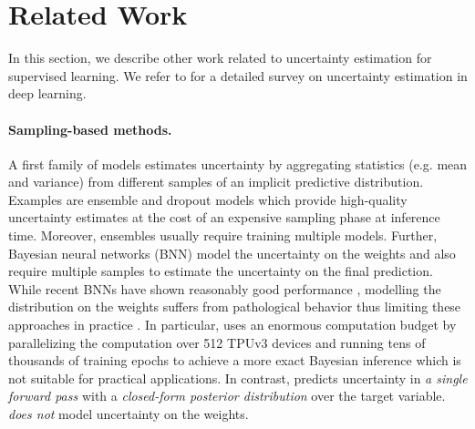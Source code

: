 \section{Related Work}
\label{sec:related_work_007}

In this section, we describe other work related to uncertainty estimation for supervised learning. We refer to \cite{uncertainty-survey} for a detailed survey on uncertainty estimation in deep learning. 

\paragraph{Sampling-based methods.} A first family of models estimates uncertainty by aggregating statistics (e.g. mean and variance) from different samples of an implicit predictive distribution. Examples are ensemble \citep{bayesian-classifier-combination,ensembles, dynamic-bayesian-combination-classifiers,batch-ensembles,hyper-ensembles} and dropout \citep{dropout} models which provide high-quality uncertainty estimates \citep{dataset-shift} at the cost of an
expensive sampling phase at inference time. Moreover, ensembles usually require training multiple models. Further, Bayesian neural networks (BNN) \citep{bayesian-networks, scalable-laplace-bnn, simple-baseline-uncertainty} model the uncertainty on the weights and also require multiple samples to estimate the uncertainty on the final prediction. While recent BNNs have shown reasonably good performance \citep{rank-1-bnn,osawa2019,liberty-depth-bnn}, modelling the distribution on the weights suffers from pathological behavior thus limiting these approaches in practice \citep{expressiveness-bnn, practical-bnn, what-bnn-posterior}. In particular, \cite{what-bnn-posterior} uses an enormous computation budget by parallelizing the computation over 512 TPUv3  devices and running tens of thousands of training epochs to achieve a more exact Bayesian inference which is not suitable for practical applications. In contrast, \NatPNacro{} predicts uncertainty in \emph{a single forward pass} with a \emph{closed-form posterior distribution} over the target variable. \NatPNacro{} \emph{does not} model uncertainty on the weights.

